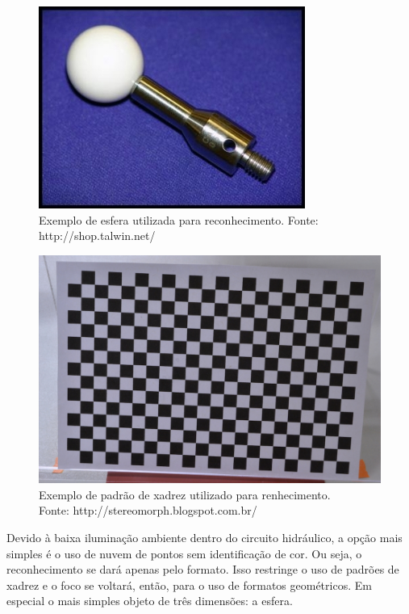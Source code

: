 \begin{figure}[h!]
   \centering
   \includegraphics[width=0.95\columnwidth]{method/figs/calibracao/sphere_rec}
   \caption{Exemplo de esfera utilizada para reconhecimento. Fonte:
   http://shop.talwin.net/}
   \label{fig::sphere_rec}
\end{figure}



\begin{figure}[h!]
   \centering
   \includegraphics[width=0.95\columnwidth]{method/figs/calibracao/checkerboard_rec}
   \caption{Exemplo de padrão de xadrez utilizado para renhecimento.\\ Fonte:
   http://stereomorph.blogspot.com.br/}
   \label{fig::checkerboard_rec}
\end{figure}


Devido à baixa iluminação ambiente dentro do circuito hidráulico, a opção
mais simples é o uso de nuvem de pontos sem identificação de cor. Ou seja, o
reconhecimento se dará apenas pelo formato. Isso restringe o uso de padrões de
xadrez e o foco se voltará, então, para o uso de formatos geométricos. Em
especial o mais simples objeto de três dimensões: a esfera.

